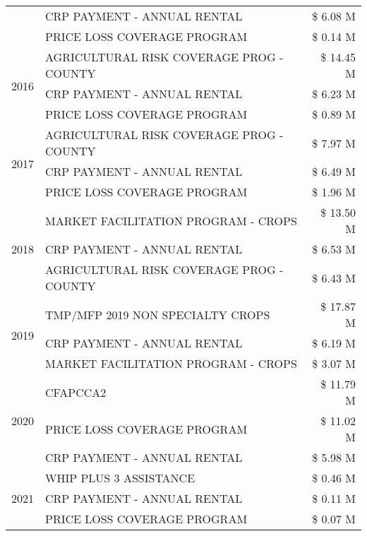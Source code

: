 \begin{tabular}{llr}
 & CRP PAYMENT - ANNUAL RENTAL & \$ 6.08 M \\
 & PRICE LOSS COVERAGE PROGRAM & \$ 0.14 M \\
\cline{1-3}
\multirow[t]{3}{*}{2016} & AGRICULTURAL RISK COVERAGE PROG - COUNTY & \$ 14.45 M \\
 & CRP PAYMENT - ANNUAL RENTAL & \$ 6.23 M \\
 & PRICE LOSS COVERAGE PROGRAM & \$ 0.89 M \\
\cline{1-3}
\multirow[t]{3}{*}{2017} & AGRICULTURAL RISK COVERAGE PROG - COUNTY & \$ 7.97 M \\
 & CRP PAYMENT - ANNUAL RENTAL & \$ 6.49 M \\
 & PRICE LOSS COVERAGE PROGRAM & \$ 1.96 M \\
\cline{1-3}
\multirow[t]{3}{*}{2018} & MARKET FACILITATION PROGRAM - CROPS & \$ 13.50 M \\
 & CRP PAYMENT - ANNUAL RENTAL & \$ 6.53 M \\
 & AGRICULTURAL RISK COVERAGE PROG - COUNTY & \$ 6.43 M \\
\cline{1-3}
\multirow[t]{3}{*}{2019} & TMP/MFP 2019 NON SPECIALTY CROPS & \$ 17.87 M \\
 & CRP PAYMENT - ANNUAL RENTAL & \$ 6.19 M \\
 & MARKET FACILITATION PROGRAM - CROPS & \$ 3.07 M \\
\cline{1-3}
\multirow[t]{3}{*}{2020} & CFAPCCA2 & \$ 11.79 M \\
 & PRICE LOSS COVERAGE PROGRAM & \$ 11.02 M \\
 & CRP PAYMENT - ANNUAL RENTAL & \$ 5.98 M \\
\cline{1-3}
\multirow[t]{3}{*}{2021} & WHIP PLUS 3 ASSISTANCE & \$ 0.46 M \\
 & CRP PAYMENT - ANNUAL RENTAL & \$ 0.11 M \\
 & PRICE LOSS COVERAGE PROGRAM & \$ 0.07 M \\
\cline{1-3}
\bottomrule
\end{tabular}
